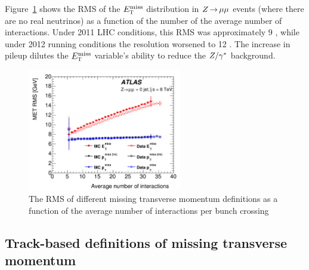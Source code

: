 Figure~\ref{fig:METResolution} shows the RMS of the $E_{\textrm{\footnotesize\sc t}}^{\rm miss}$ distribution in $Z\,{\rightarrow}\,\mu\mu$ events (where there are no real neutrinos) as a function of the number of the average number of interactions. Under 2011 LHC conditions, this RMS was approximately 9 \GeV, while under 2012 running conditions the resolution worsened to 12 \GeV. The increase in pileup dilutes the $E_{\textrm{\footnotesize\sc t}}^{\rm miss}$ variable's ability to reduce the $Z/\gamma^{\ast}$ background. 

\begin{figure}[h!]
  \centering
  \captionsetup{justification=centering}

  \includegraphics[width=0.6\textwidth]{figures/METResolution}
  \caption{The RMS of different missing transverse momentum definitions as a function of the average number of interactions per bunch crossing}
  \label{fig:METResolution}
\end{figure}

\subsection{Track-based definitions of missing transverse momentum}

